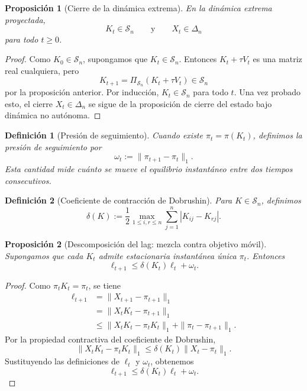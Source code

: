 \documentclass[12pt]{article}
\newtheorem{definicion}{Definición}[section]
\newtheorem{proposicion}{Proposición}[section]
\begin{document}
\begin{proposicion}[Cierre de la dinámica extrema]
En la dinámica extrema proyectada,
\[
K_t\in\mathcal S_n
\qquad
\text{y}
\qquad
X_t\in\Delta_n
\]
para todo \(t\geq 0\).
\end{proposicion}

\begin{proof}
Como \(K_0\in\mathcal S_n\), supongamos que \(K_t\in\mathcal S_n\). Entonces
\(K_t+\tau V_t\) es una matriz real cualquiera, pero
\[
K_{t+1}=\Pi_{\mathcal S_n}(K_t+\tau V_t)\in\mathcal S_n
\]
por la proposición anterior. Por inducción, \(K_t\in\mathcal S_n\) para todo
\(t\). Una vez probado esto, el cierre \(X_t\in\Delta_n\) se sigue de la
proposición de cierre del estado bajo dinámica no autónoma.
\end{proof}

\begin{definicion}[Presión de seguimiento]
Cuando existe \(\pi_t=\pi(K_t)\), definimos la presión de seguimiento por
\[
\omega_t:=\|\pi_{t+1}-\pi_t\|_1.
\]
Esta cantidad mide cuánto se mueve el equilibrio instantáneo entre dos tiempos
consecutivos.
\end{definicion}

\begin{definicion}[Coeficiente de contracción de Dobrushin]
Para \(K\in\mathcal S_n\), definimos
\[
\delta(K)
:=
\frac12\max_{1\leq i,r\leq n}
\sum_{j=1}^n |K_{ij}-K_{rj}|.
\]
\end{definicion}

\begin{proposicion}[Descomposición del lag: mezcla contra objetivo móvil]
Supongamos que cada \(K_t\) admite estacionaria instantánea única
\(\pi_t\). Entonces
\[
\ell_{t+1}
\leq
\delta(K_t)\ell_t+
\omega_t.
\]
\end{proposicion}

\begin{proof}
Como \(\pi_tK_t=\pi_t\), se tiene
\begin{align*}
\ell_{t+1}
&=\|X_{t+1}-\pi_{t+1}\|_1\\
&=\|X_tK_t-\pi_{t+1}\|_1\\
&\leq \|X_tK_t-\pi_tK_t\|_1+\|\pi_t-\pi_{t+1}\|_1.
\end{align*}
Por la propiedad contractiva del coeficiente de Dobrushin,
\[
\|X_tK_t-\pi_tK_t\|_1
\leq
\delta(K_t)\|X_t-\pi_t\|_1.
\]
Sustituyendo las definiciones de \(\ell_t\) y \(\omega_t\), obtenemos
\[
\ell_{t+1}
\leq
\delta(K_t)\ell_t+
\omega_t.
\]
\end{proof}
\end{document}
